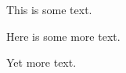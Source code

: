 \documentclass{article}
\begin{document}
This is some text.



Here is some more text.



Yet more text.
\end{document}
